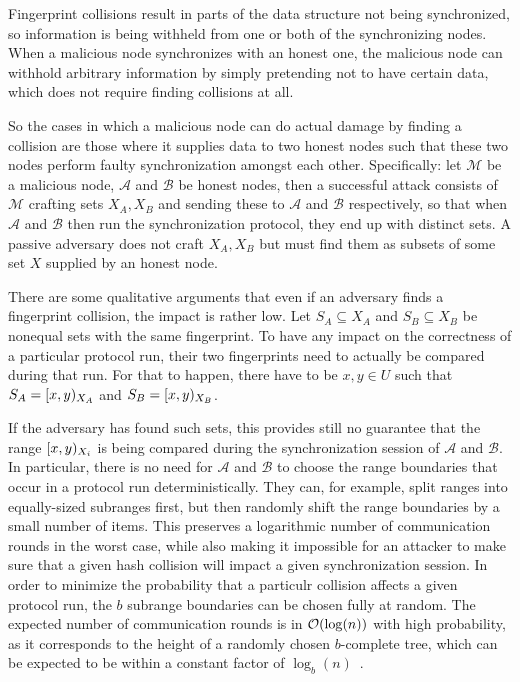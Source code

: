 \documentclass[conference]{IEEEtran}
\begin{document}
Fingerprint collisions result in parts of the data structure not being synchronized, so information is being withheld from one or both of the synchronizing nodes. When a malicious node synchronizes with an honest one, the malicious node can withhold arbitrary information by simply pretending not to have certain data, which does not require finding collisions at all.

So the cases in which a malicious node can do actual damage by finding a collision are those where it supplies data to two honest nodes such that these two nodes perform faulty synchronization amongst each other. Specifically: let $\mathcal{M}$ be a malicious node, $\mathcal{A}$ and $\mathcal{B}$ be honest nodes, then a successful attack consists of $\mathcal{M}$ crafting sets $X_A, X_B$ and sending these to $\mathcal{A}$ and $\mathcal{B}$ respectively, so that when $\mathcal{A}$ and $\mathcal{B}$ then run the synchronization protocol, they end up with distinct sets. A passive adversary does not craft $X_A, X_B$ but must find them as subsets of some set $X$ supplied by an honest node.

There are some qualitative arguments that even if an adversary finds a fingerprint collision, the impact is rather low. Let $S_A \subseteq X_A$ and $S_B \subseteq X_B$ be nonequal sets with the same fingerprint. To have any impact on the correctness of a particular protocol run, their two fingerprints need to actually be compared during that run. For that to happen, there have to be $x, y \in U$ such that $S_A = [{x},{y})_{X_A}$ and $S_B = [{x},{y})_{X_B}$.

If the adversary has found such sets, this provides still no guarantee that the range $[{x},{y})_{X_i}$ is being compared during the synchronization session of $\mathcal{A}$ and $\mathcal{B}$. In particular, there is no need for $\mathcal{A}$ and $\mathcal{B}$ to choose the range boundaries that occur in a protocol run deterministically. They can, for example, split ranges into equally-sized subranges first, but then randomly shift the range boundaries by a small number of items. This preserves a logarithmic number of communication rounds in the worst case, while also making it impossible for an attacker to make sure that a given hash collision will impact a given synchronization session. In order to minimize the probability that a particulr collision affects a given protocol run, the $b$ subrange boundaries can be chosen fully at random. The expected number of communication rounds is in $\mathcal{O}(\log(n))$ with high probability, as it corresponds to the height of a randomly chosen $b$-complete tree, which can be expected to be within a constant factor of $\log_b(n)$~\cite{devroye1990height}.
\end{document}
